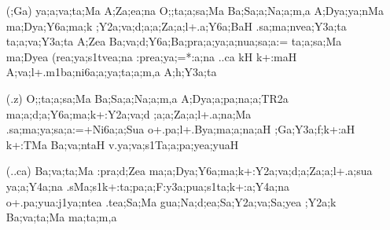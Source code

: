 \begin{spacing}{1.15}
\begin{itemize}
\begin{itemize}
            \item[({\sktf ;Ga})] {\sktf ya;a;va;ta;Ma A;Za;ea;na
O;;ta;a;sa;Ma Ba;Sa;a;Na;a;m,a A;Dya;ya;nMa ma;Dya;Y6a;ma;k
;Y2a;va;d;a;a;Za;a;l+.a;Y6a;BaH .sa;ma;nvea;Y3a;ta\ZF{,}
ta;a;va;Y3a;ta A;Zea Ba;va;d;Y6a;Ba;pra;a;ya;a;nua;sa;a:=
ta;a;sa;Ma ma;Dyea (rea;ya;s1tvea;na :prea;ya;=*:a;na
..ca kH k+:maH A;va;l+.m1ba;ni6a;a;ya;ta;a;m,a A;h;Y3a;ta} 
            
   \item[({\sktf .z})] {\sktf O;;ta;a;sa;Ma Ba;Sa;a;Na;a;m,a
A;Dya;a;pa;na;a;TR2a ma;a;d;a;Y6a;ma;k+:Y2a;va;d%
;a;a;Za;a;l+.a;na;Ma .sa;ma;ya;sa;a:=+Ni6a;a;Sua
o+.pa;l+.Bya;ma;a;na;aH ;Ga;Y3a;f;k+:aH k+:TMa Ba;va;ntaH
v.ya;va;s1Ta;a;pa;yea;yuaH}
            
   \item[({\sktf ..ca})] {\sktf Ba;va;ta;Ma :pra;d;Zea
ma;a;Dya;Y6a;ma;k+:Y2a;va;d;a;Za;a;l+.a;sua ya;a;Y4a;na
.sMa;s1k+:ta;pa;a;F:y3a;pua;s1ta;k+:a;Y4a;na
o+.pa;yua:j1ya;ntea\ZF{,} .tea;Sa;Ma gua;Na;d;ea;Sa;Y2a;va;Sa;yea
;Y2a;k Ba;va;ta;Ma ma;ta;m,a}
            \end{itemize}
\end{itemize}
\end{spacing}

\newpage

